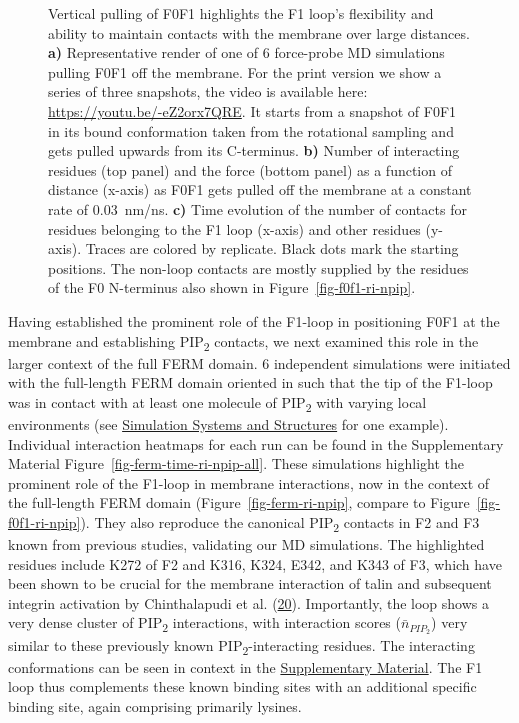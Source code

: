 \documentclass[
  twocolumn]{biophys-new-mod}
\begin{document}
\begin{figure}
\begin{minipage}[t]{0.50\linewidth}
\subcaption{\label{fig-f0f1-vert-pull-contacts}~}
\end{minipage}%

\caption{\label{fig-f0f1-vert-pull}Vertical pulling of F0F1 highlights
the F1 loop's flexibility and ability to maintain contacts with the
membrane over large distances. \textbf{a)} Representative render of one
of 6 force-probe MD simulations pulling F0F1 off the membrane. For the
print version we show a series of three snapshots, the video is
available here: \url{https://youtu.be/-eZ2orx7QRE}. It starts from a
snapshot of F0F1 in its bound conformation taken from the rotational
sampling and gets pulled upwards from its C-terminus. \textbf{b)} Number
of interacting residues (top panel) and the force (bottom panel) as a
function of distance (x-axis) as F0F1 gets pulled off the membrane at a
constant rate of 0.03~nm/ns. \textbf{c)} Time evolution of the number of
contacts for residues belonging to the F1 loop (x-axis) and other
residues (y-axis). Traces are colored by replicate. Black dots mark the
starting positions. The non-loop contacts are mostly supplied by the
residues of the F0 N-terminus also shown in
Figure~\ref{fig-f0f1-ri-npip}.}

\end{figure}

Having established the prominent role of the F1-loop in positioning F0F1
at the membrane and establishing PIP\textsubscript{2} contacts, we next
examined this role in the larger context of the full FERM domain. 6
independent simulations were initiated with the full-length FERM domain
oriented in such that the tip of the F1-loop was in contact with at
least one molecule of PIP\textsubscript{2} with varying local
environments (see \protect\hyperlink{sec-system}{Simulation Systems and
Structures} for one example). Individual interaction heatmaps for each
run can be found in the Supplementary Material
Figure~\ref{fig-ferm-time-ri-npip-all}. These simulations highlight the
prominent role of the F1-loop in membrane interactions, now in the
context of the full-length FERM domain (Figure~\ref{fig-ferm-ri-npip},
compare to Figure~\ref{fig-f0f1-ri-npip}). They also reproduce the
canonical PIP\textsubscript{2} contacts in F2 and F3 known from previous
studies, validating our MD simulations. The highlighted residues include
K272 of F2 and K316, K324, E342, and K343 of F3, which have been shown
to be crucial for the membrane interaction of talin and subsequent
integrin activation by Chinthalapudi et al.
(\protect\hyperlink{ref-chinthalapudiInteractionTalinCell2018a}{20}).
Importantly, the loop shows a very dense cluster of PIP\textsubscript{2}
interactions, with interaction scores (\(\bar n_{PIP_2}\)) very similar
to these previously known PIP\textsubscript{2}-interacting residues. The
interacting conformations can be seen in context in the
\protect\hyperlink{sec-system}{Supplementary Material}. The F1 loop thus
complements these known binding sites with an additional specific
binding site, again comprising primarily lysines.
\end{document}
